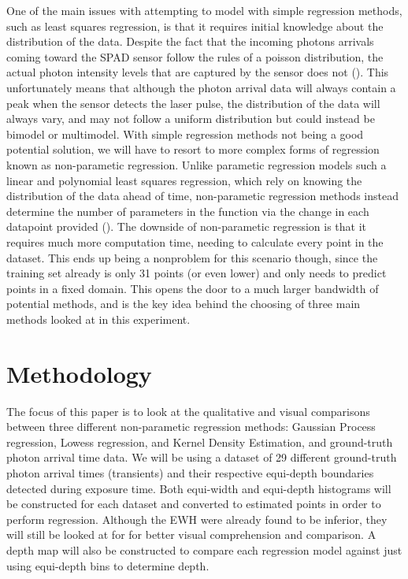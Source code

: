 \documentclass[letterpaper,12pt]{article}
\begin{document}
One of the main issues with attempting to model with simple regression methods, such as 
least squares regression, is that it requires initial knowledge about the distribution of
the data. Despite the fact that the incoming photons arrivals coming toward the SPAD sensor 
follow the rules of a poisson distribution, the actual photon intensity levels that are captured 
by the sensor does not (\cite{ingle2019high}). This unfortunately means that although the 
photon arrival data will always contain a peak when the sensor detects the laser pulse, the
distribution of the data will always vary, and may not follow a uniform distribution but
could instead be bimodel or multimodel. With simple regression methods not being a good 
potential solution, we will have to resort to more complex forms of regression known
as non-parametic regression. Unlike parametic regression models such a linear and polynomial
least squares regression, which rely on knowing the distribution of the data ahead of time,
non-parametic regression methods instead determine the number of parameters in the function
via the change in each datapoint provided (\cite{mahoud2019parametic}). The downside of 
non-parametic regression is that it requires much more computation time, needing to calculate
every point in the dataset. This ends up being a nonproblem for this scenario though,
since the training set already is only 31 points (or even lower) and only needs to predict
points in a fixed domain. This opens the door to a much larger bandwidth of potential methods, 
and is the key idea behind the choosing of three main methods looked at in this experiment.

\section{Methodology}
The focus of this paper is to look at the qualitative and visual comparisons between
three different non-parametic regression methods: Gaussian Process regression, Lowess
regression, and Kernel Density Estimation, and ground-truth photon arrival time data.
We will be using a dataset of 29 different ground-truth photon arrival times
(transients) and their respective equi-depth boundaries detected during exposure time.
Both equi-width and equi-depth histograms will be constructed for each dataset and converted
to estimated points in order to perform regression. Although the EWH were already found
to be inferior, they will still be looked at for for better visual comprehension and 
comparison. A depth map will also be constructed to compare each regression model
against just using equi-depth bins to determine depth.
\end{document}
